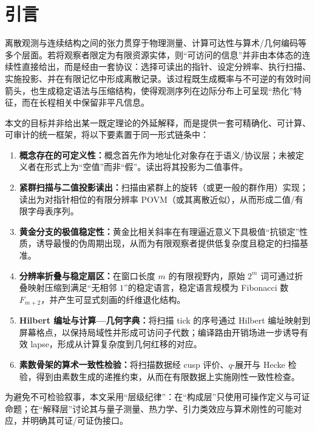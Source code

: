 \section{引言}

离散观测与连续结构之间的张力贯穿于物理测量、计算可达性与算术/几何编码等多个层面。若将观察者限定为有限资源实体，则“可访问的信息”并非由本体态的连续性直接给出，而是经由一套协议：选择可读出的指针、设定分辨率、执行扫描、实施投影、并在有限记忆中形成离散记录。该过程既生成概率与不可逆的有效时间箭头，也生成稳定语法与压缩结构，使得观测序列在边际分布上可呈现“热化”特征，而在长程相关中保留非平凡信息。

本文的目标并非给出某一既定理论的外延解释，而是提供一套可精确化、可计算、可审计的统一框架，将以下要素置于同一形式链条中：
\begin{enumerate}
  \item \textbf{概念存在的可定义性：}概念首先作为地址化对象存在于语义/协议层；未被定义者在形式上为“空值”而非“假”。读出将其投影为二值事件。
  \item \textbf{紧群扫描与二值投影读出：}扫描由紧群上的旋转（或更一般的群作用）实现；读出为对指针相位的有限分辨率 POVM（或其离散近似），从而形成二值/有限字母表序列。
  \item \textbf{黄金分支的极值稳定性：}黄金比相关斜率在有理逼近意义下具极值“抗锁定”性质，诱导最慢的伪周期出现，从而为有限观察者提供低复杂度且稳定的扫描基准。
  \item \textbf{分辨率折叠与稳定扇区：}在窗口长度 $m$ 的有限视野内，原始 $2^m$ 词可通过折叠映射压缩到满足“无相邻 $1$”的稳定语言，稳定语言规模为 Fibonacci 数 $F_{m+2}$，并产生可显式刻画的纤维退化结构。
  \item \textbf{Hilbert 编址与计算—几何字典：}将扫描 tick 的序号通过 Hilbert 编址映射到屏幕格点，以保持局域性并形成可访问子代数；编译路由开销场进一步诱导有效 lapse，形成从计算复杂度到几何红移的对应。
  \item \textbf{素数骨架的算术一致性检验：}将扫描数据经 cusp 评价、$q$-展开与 Hecke 检验，得到由素数生成的递推约束，从而在有限数据上实施刚性一致性检查。
\end{enumerate}

为避免不可检验叙事，本文采用“层级纪律”：在“构成层”只使用可操作定义与可证命题；在“解释层”讨论其与量子测量、热力学、引力类效应与算术刚性的可能对应，并明确其可证/可证伪接口。

